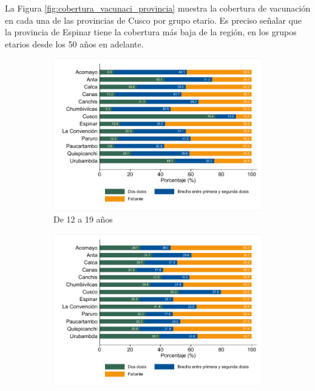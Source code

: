 \documentclass[12pt,a4paper,openany]{book}
\begin{document}
La Figura \ref{fig:cobertura_vacunaci_provincia}  muestra la cobertura de vacunación en cada una de las provincias de Cusco por grupo etario. Es preciso señalar que la provincia de Espinar tiene la cobertura más baja de la región, en los grupos etarios desde los 50 años en adelante.

\begin{figure}[h]
	\caption{Cobertura de Vacunación por Provincia y por Grupo Etario en la Región Cusco, hasta la SE 47.}
	\label{fig:cobertura_vacunaci_provincia}
	\centering
	\begin{subfigure}[b]{0.45\textwidth}
		\centering
		\includegraphics[width=\textwidth]{../figuras/vacunacion_provincial_edad_1}
		\caption{ De 12 a 19 años}
	\end{subfigure}
	\hfill
	\begin{subfigure}[b]{0.45\textwidth}
		\centering
		\includegraphics[width=\textwidth]{../figuras/vacunacion_provincial_edad_2}

\end{subfigure}
\end{figure}
\end{document}
